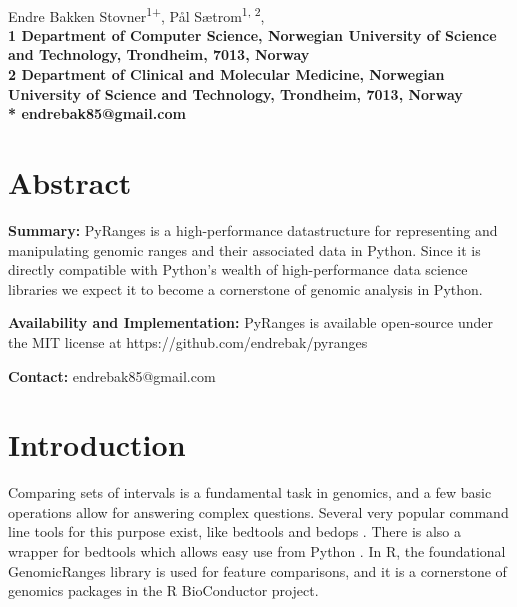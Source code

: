 \documentclass[10pt,letterpaper]{article}
\begin{document}
\vspace*{0.35in}

\begin{flushleft}
{\Large
  \textbf{}
}
\newline
\\
Endre Bakken Stovner\textsuperscript{1}\textsuperscript{+},
Pål Sætrom\textsuperscript{1, 2},
\\
\bf{1} Department of
  Computer Science, Norwegian University
  of Science and Technology, Trondheim, 7013, Norway
\\
\bf{2} Department of Clinical and Molecular Medicine, Norwegian
  University of Science and Technology, Trondheim, 7013, Norway
\\
\bigskip
* endrebak85@gmail.com

\end{flushleft}

\section*{Abstract}

\textbf{Summary:} PyRanges is a high-performance datastructure for
representing and manipulating genomic ranges and their associated data in
Python. Since it is directly compatible with Python's wealth of high-performance
data science libraries we expect it to become a cornerstone of genomic analysis
in Python.

\textbf{Availability and Implementation:} PyRanges is available open-source under
the MIT license at https://github.com/endrebak/pyranges

\textbf{Contact:} endrebak85@gmail.com

\section*{Introduction}

Comparing sets of intervals is a fundamental task in genomics, and a few basic
operations allow for answering complex questions. Several very popular command
line tools for this purpose exist, like bedtools
\cite{doi:10.1093/bioinformatics/btq033} and bedops
\cite{doi:10.1093/bioinformatics/bts277}. There is also a wrapper for bedtools
which allows easy use from Python \cite{doi:10.1093/bioinformatics/btr539}. In
R, the foundational GenomicRanges library \cite{10.1371/journal.pcbi.1003118} is
used for feature comparisons, and it is a cornerstone of genomics packages in
the R BioConductor project.
\end{document}
